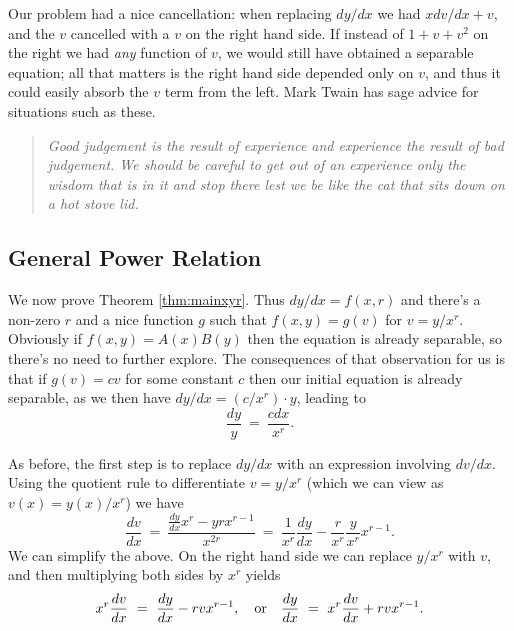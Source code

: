 \documentclass[12pt,reqno]{amsart}
\theoremstyle{plain}
\numberwithin{equation}{section} %
\numberwithin{table}{section} %
\numberwithin{figure}{section}
\begin{document}
Our problem had a nice cancellation: when replacing $dy/dx$ we had $x dv/dx + v$, and the $v$ cancelled with a $v$ on the right hand side. If instead of $1 + v + v^2$ on the right we had \emph{any} function of $v$, we would still have obtained a separable equation; all that matters is the right hand side depended only on $v$, and thus it could easily absorb the $v$ term from the left. Mark Twain has sage advice for situations such as these. \begin{quote} \emph{Good judgement is the result of experience and experience the result of bad judgement. We should be careful to get out of an experience only the wisdom that is in it and stop there lest we be like the cat that sits down on a hot stove lid.} \end{quote}

\subsection{General Power Relation}

We now prove Theorem \ref{thm:mainxyr}. Thus $dy/dx = f(x,r)$ and there's a non-zero $r$ and a nice function $g$ such that $f(x,y) = g(v)$ for $v = y/x^r$. Obviously if $f(x,y) = A(x) B(y)$ then the equation is already separable, so there's no need to further explore. The consequences of that observation for us is that if $g(v) = c v$ for some constant $c$ then our initial equation is already separable, as we then have $dy/dx = (c/x^r) \cdot y$, leading to \begin{equation} \frac{dy}{y} \ = \ \frac{c dx}{x^r}. \end{equation}

As before, the first step is to replace $dy/dx$ with an expression involving $dv/dx$. Using the quotient rule to differentiate $v = y/x^r$ (which we can view as $v(x) = y(x)/x^r$) we have \begin{equation} \frac{dv}{dx} \ = \ \frac{\frac{dy}{dx} x^r - y r x^{r-1}}{x^{2r}} \ = \  \frac{1}{x^r} \frac{dy}{dx} - \frac{r}{x^r} \frac{y}{x^r} x^{r-1}. \end{equation} We can simplify the above. On the right hand side we can replace $y/x^r$ with $v$, and then multiplying both sides by $x^r$ yields \begin{equation} x^r \frac{dv}{dx} \ = \ \frac{dy}{dx} - r v x^{r-1}, \ \ \ {\rm or} \ \ \ \frac{dy}{dx} \ = \ x^r \frac{dv}{dx} + rvx^{r-1}. \end{equation}
\end{document}
